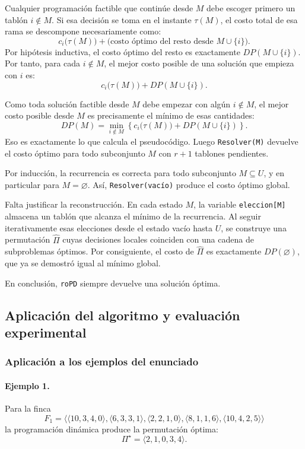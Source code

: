 \documentclass[12pt,a4paper]{article}
\newcommand{\cost}[1]{c_{#1}}
\begin{document}
Cualquier programaci\'on factible que contin\'ue desde \(M\) debe escoger primero un tabl\'on \(i \notin M\). Si esa decisi\'on se toma en el instante \(\tau(M)\), el costo total de esa rama se descompone necesariamente como:
\[
\cost{i}\bigl(\tau(M)\bigr) + \text{(costo \'optimo del resto desde } M \cup \{i\}\text{)}.
\]
Por hip\'otesis inductiva, el costo \'optimo del resto es exactamente \(DP(M \cup \{i\})\). Por tanto, para cada \(i \notin M\), el mejor costo posible de una soluci\'on que empieza con \(i\) es:
\[
\cost{i}\bigl(\tau(M)\bigr) + DP(M \cup \{i\}).
\]

Como toda soluci\'on factible desde \(M\) debe empezar con alg\'un \(i \notin M\), el mejor costo posible desde \(M\) es precisamente el m\'inimo de esas cantidades:
\[
DP(M)=\min_{i \notin M}\left\{ \cost{i}\bigl(\tau(M)\bigr) + DP(M \cup \{i\}) \right\}.
\]
Eso es exactamente lo que calcula el pseudoc\'odigo. Luego \texttt{Resolver(M)} devuelve el costo \'optimo para todo subconjunto \(M\) con \(r+1\) tablones pendientes.

Por inducci\'on, la recurrencia es correcta para todo subconjunto \(M \subseteq U\), y en particular para \(M=\varnothing\). As\'i, \texttt{Resolver(vac\'io)} produce el costo \'optimo global.

Falta justificar la reconstrucci\'on. En cada estado \(M\), la variable \texttt{eleccion[M]} almacena un tabl\'on que alcanza el m\'inimo de la recurrencia. Al seguir iterativamente esas elecciones desde el estado vac\'io hasta \(U\), se construye una permutaci\'on \(\widehat{\Pi}\) cuyas decisiones locales coinciden con una cadena de subproblemas \'optimos. Por consiguiente, el costo de \(\widehat{\Pi}\) es exactamente \(DP(\varnothing)\), que ya se demostr\'o igual al m\'inimo global.

En conclusi\'on, \texttt{roPD} siempre devuelve una soluci\'on \'optima.

\subsection{Aplicaci\'on del algoritmo y evaluaci\'on experimental}

\subsubsection{Aplicaci\'on a los ejemplos del enunciado}

\paragraph{Ejemplo 1.}
Para la finca
\[
F_1=\langle\langle 10,3,4,0\rangle,\langle 6,3,3,1\rangle,\langle 2,2,1,0\rangle,\langle 8,1,1,6\rangle,\langle 10,4,2,5\rangle\rangle
\]
la programaci\'on din\'amica produce la permutaci\'on \'optima:
\[
\Pi^\star=\langle 2,1,0,3,4\rangle.
\]
\end{document}
